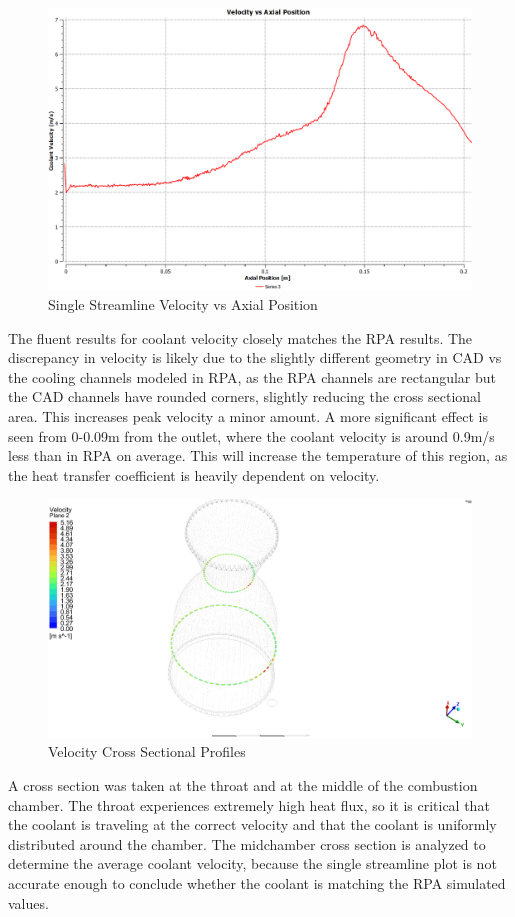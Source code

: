 \begin{figure}
    \centering
    \includegraphics[width=1\linewidth]{Images/Single Streamline Velocity vs Axial Position.png}
    \caption{Single Streamline Velocity vs Axial Position}
    \label{fig:Single Streamline Velocity vs Axial Position}
\end{figure}
The fluent results for coolant velocity closely matches the RPA results. The discrepancy in velocity is likely due to the slightly different geometry in CAD vs the cooling channels modeled in RPA, as the RPA channels are rectangular but the CAD channels have rounded corners, slightly reducing the cross sectional area. This increases peak velocity a minor amount. A more significant effect is seen from 0-0.09m from the outlet, where the coolant velocity is around 0.9m/s less than in RPA on average. This will increase the temperature of this region, as the heat transfer coefficient is heavily dependent on velocity.
\begin{figure}
    \centering
    \includegraphics[width=1\linewidth]{Images/Velocity Cross Sectional Profiles.png}
    \caption{Velocity Cross Sectional Profiles}
    \label{fig:Velocity Cross Sectional Profiles}
\end{figure}
A cross section was taken at the throat and at the middle of the combustion chamber. The throat experiences extremely high heat flux, so it is critical that the coolant is traveling at the correct velocity and that the coolant is uniformly distributed around the chamber. The midchamber cross section is analyzed to determine the average coolant velocity, because the single streamline plot is not accurate enough to conclude whether the coolant is matching the RPA simulated values. 


